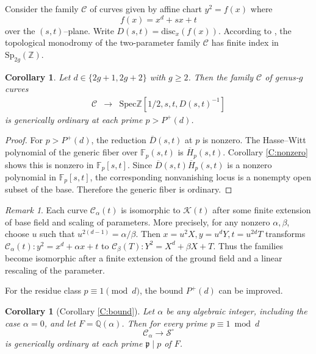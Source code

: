 \documentclass{amsart}
\theoremstyle{plain}
\newtheorem{corollary}[theorem]{Corollary}
\theoremstyle{remark}
\newtheorem{remark}[theorem]{Remark}
\theoremstyle{remark}
\newcommand{\fp}{\mathfrak{p}}
\newcommand{\cS}{\mathcal{S}}
\newcommand{\cK}{\mathcal{K}}
\newcommand{\cC}{\mathcal{C}}
\newcommand{\Spec}{\mathrm{Spec}}
\newcommand{\Sp}{\mathrm{Sp}}
\newcommand{\disc}{\mathrm{disc}}
\renewcommand{\bar}{\overline}
\newcommand{\0}{\mathbf{0}}
\newcommand{\1}{\mathbf{1}}
\newcommand{\F}{\mathbb{F}}
\newcommand{\Q}{\mathbb{Q}}
\newcommand{\Z}{\mathbb{Z}}
\begin{document}
Consider the family $\cC$ of curves 
given by affine chart $y^2=f(x)$ where
$$f(x)=x^d+sx+t$$ over the $(s,t)$--plane. 
Write $D(s,t)=\disc_x(f(x))$.
According to \cite{Kat14}, the topological monodromy
of the two-parameter family $\cC$ has finite index in $\Sp_{2g}(\Z)$.

\begin{corollary}\label{C:plane}
Let $d\in\{2g+1,2g+2\}$ with $g\ge 2$.
Then the family $\cC$ of genus-$g$ curves 
\begin{eqnarray*}
\cC&\longrightarrow & \Spec\Z[1/2,s,t,D(s,t)^{-1}]
\end{eqnarray*}
is generically ordinary at each prime $p>P^+(d)$. 
\end{corollary}
\begin{proof}
For $p>P^+(d)$, the reduction $\bar{D}(s,t)$ at $p$ 
is nonzero.
The Hasse--Witt polynomial
of the generic fiber over $\F_p(s,t)$ is 
$\bar{H}_p(s,t)$. 
Corollary \ref{C:nonzero} shows this is nonzero in $\F_p[s,t]$.
Since $\bar{D}(s,t)\bar{H}_p(s,t)$ 
is a nonzero polynomial in $\F_p[s,t]$, the corresponding 
nonvanishing locus is a nonempty open subset of the base.
Therefore the generic fiber is ordinary.
\end{proof}

\begin{remark}
Each curve $\cC_\alpha(t)$ is isomorphic to 
$\cK(t)$ after some finite extension of base field and scaling 
of parameters. More precisely, 
for any nonzero $\alpha, \beta$, choose $u$ such that $u^{2(d-1)}=\alpha/\beta$.
Then $x=u^2X, y=u^dY, t=u^{2d}T$ transforms 
$\cC_\alpha(t): y^2=x^d+\alpha x+t$ to $\cC_\beta(T): Y^2=X^d+\beta X+T$.
Thus the families become isomorphic after a finite extension of the ground field and a linear rescaling of the parameter.
\end{remark}

For the residue class $p\equiv 1\pmod d$, the bound $P^+(d)$ can be improved.

\begin{corollary}[Corollary \ref{C:bound}]\label{C:bound-proof}
Let $\alpha$ be any algebraic integer, including the case $\alpha=0$, and let $F=\Q(\alpha)$.
Then for every prime $p\equiv 1\bmod d$ 
$$\cC_\alpha \longrightarrow \cS^\circ$$
is generically ordinary at each prime $\fp\mid p$ of $F$.
\end{corollary}
\end{document}
